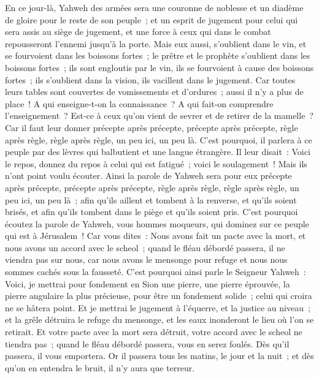\begin{multicols}{2}
En ce jour-là, Yahweh des armées sera une couronne de noblesse et un diadème de gloire pour le reste de son peuple~;
et un esprit de jugement pour celui qui sera assis au siège de jugement, et une force à ceux qui dans le combat repousseront l'ennemi jusqu'à la porte.
Mais eux aussi, s'oublient dans le vin, et se fourvoient dans les boissons fortes~; le prêtre et le prophète s'oublient dans les boissons fortes~; ils sont engloutis par le vin, ils se fourvoient à cause des boissons fortes~; ils s'oublient dans la vision, ils vacillent dans le jugement.
Car toutes leurs tables sont couvertes de vomissements et d'ordures~; aussi il n'y a plus de place~!
A qui enseigne-t-on la connaissance~? A qui fait-on comprendre l'enseignement~? Est-ce à ceux qu'on vient de sevrer et de retirer de la mamelle~?
Car il faut leur donner précepte après précepte, précepte après précepte, règle après règle, règle après règle, un peu ici, un peu là.
C'est pourquoi, il parlera à ce peuple par des lèvres qui balbutient et une langue étrangère.
Il leur disait~: Voici le repos, donnez du repos à celui qui est fatigué~; voici le soulagement~! Mais ils n'ont point voulu écouter.
Ainsi la parole de Yahweh sera pour eux précepte après précepte, précepte après précepte, règle après règle, règle après règle, un peu ici, un peu là~; afin qu'ils aillent et tombent à la renverse, et qu'ils soient brisés, et afin qu'ils tombent dans le piège et qu'ils soient pris.
C'est pourquoi écoutez la parole de Yahweh, vous hommes moqueurs, qui dominez sur ce peuple qui est à Jérusalem~!
Car vous dites~: Nous avons fait un pacte avec la mort, et nous avons un accord avec le scheol~; quand le fléau débordé passera, il ne viendra pas sur nous, car nous avons le mensonge pour refuge et nous nous sommes cachés sous la fausseté.
C'est pourquoi ainsi parle le Seigneur Yahweh~: Voici, je mettrai pour fondement en Sion une pierre, une pierre éprouvée, la pierre angulaire la plus précieuse, pour être un fondement solide~; celui qui croira ne se hâtera point.
Et je mettrai le jugement à l'équerre, et la justice au niveau~; et la grêle détruira le refuge du mensonge, et les eaux inonderont le lieu où l'on se retirait.
Et votre pacte avec la mort sera détruit, votre accord avec le scheol ne tiendra pas~; quand le fléau débordé passera, vous en serez foulés.
Dès qu'il passera, il vous emportera. Or il passera tous les matins, le jour et la nuit~; et dès qu'on en entendra le bruit, il n'y aura que terreur.

\end{multicols}

